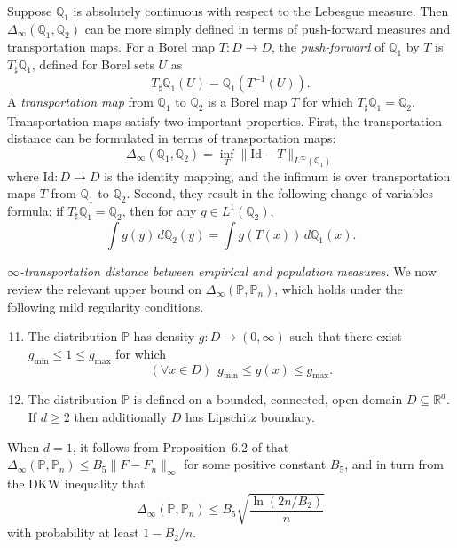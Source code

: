 \documentclass[twoside,11pt]{article}
\newcommand{\Reals}{\mathbb{R}}
\newcommand{\1}{\mathbf{1}}
\newcommand{\Rd}{\Reals^d}
\newcommand{\Leb}{L}
\newcommand{\mbb}[1]{\mathbb{#1}}
\newcommand{\Pbb}{\mathbb{P}}
\begin{document}
Suppose $\mbb{Q}_1$ is absolutely continuous with respect to the Lebesgue measure. Then $\Delta_{\infty}(\mbb{Q}_1,\mbb{Q}_2)$ can be more simply defined in terms of push-forward measures and transportation maps. For a Borel map $T: D \to D$, the \emph{push-forward} of $\mbb{Q}_1$ by $T$ is $T_{\sharp}\mbb{Q}_1$, defined for Borel sets $U$ as 
\begin{equation*}
T_{\sharp}\mbb{Q}_1(U) = \mbb{Q}_1(T^{-1}(U)).
\end{equation*}
A \emph{transportation map} from $\mbb{Q}_1$ to $\mbb{Q}_2$ is a Borel map $T$ for which $T_{\sharp}\mbb{Q}_1 = \mbb{Q}_2$. Transportation maps satisfy two important properties. First, the transportation distance can be formulated in terms of transportation maps:
\begin{equation*}
\Delta_{\infty}(\mbb{Q}_1,\mbb{Q}_2) = \inf_{T} \|\mathrm{Id} - T\|_{\Leb^{\infty}(\mbb{Q}_1)}
\end{equation*}
where $\mathrm{Id}: D \to D$ is the identity mapping, and the infimum is over transportation maps $T$ from $\mbb{Q}_1$ to $\mbb{Q}_2$. Second, they result in the following change of variables formula; if $T_{\sharp}\mbb{Q}_1 = \mbb{Q}_2$, then for any $g \in L^1(\mbb{Q}_2)$,
\begin{equation}
\label{eqn:transportation_map_change_of_variable}
\int g(y) \,d\mbb{Q}_2(y) = \int g(T(x)) \,d\mbb{Q}_1(x).
\end{equation} 

\noindent \emph{$\infty$-transportation distance between empirical and population measures.}
We now review the relevant upper bound on $\Delta_{\infty}(\Pbb,\Pbb_n)$, which holds under the following mild regularity conditions.
\begin{enumerate}[label=(A\arabic*)]
	\setcounter{enumi}{10}
	\item 
	\label{asmp:bounded_density_full} 
	The distribution $\Pbb$ has density $g: D \to (0,\infty)$ such that there exist $g_{\min} \leq 1 \leq g_{\max}$ for which
	\begin{equation*}
	(\forall x \in D)~~ g_{\min} \leq g(x) \leq g_{\max}.
	\end{equation*}
	\item 
	\label{asmp:domain_full} 
	The distribution $\Pbb$ is defined on a bounded, connected, open domain $D \subseteq \Rd$. If $d \geq 2$ then additionally $D$ has Lipschitz boundary.
\end{enumerate}
When $d = 1$, it follows from Proposition~6.2 of \cite{dudley1968} that $\Delta_{\infty}(\Pbb,\Pbb_n) \leq B_5 \|F - F_n\|_{\infty}$ for some positive constant $B_5$, and in turn from the DKW inequality that
\begin{equation}
\label{eqn:ot_distance_1d}
\Delta_{\infty}(\Pbb,\Pbb_n) \leq B_5 \sqrt{\frac{\ln(2n/B_2)}{n}}
\end{equation}
with probability at least $1 - B_2/n$.
\end{document}
